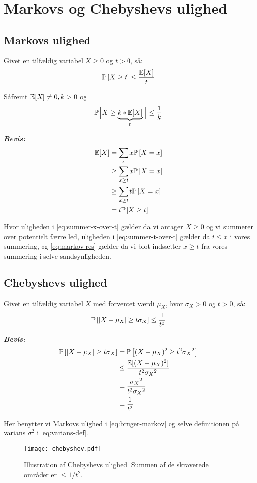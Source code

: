\section{Markovs og Chebyshevs ulighed}
\subsection{Markovs ulighed}
Givet en tilfældig variabel $X \geq 0$ og $t > 0$, så:
\begin{align}
  \P{X \geq t} \leq \frac{\E[X]}{t} \label{eq:markov}
\end{align}

Såfremt $\E[X] \neq 0, k > 0$ og
$$
\mathbb{P} \Big[X \geq \underbrace{k * \E[X]}_{t} \Big] \leq \frac{1}{k}
$$

\textit{\textbf{Bevis:}}
\begin{align}
  \E[X]
  &= \sum_x x \P{X = x} \nonumber \\
  &\geq \sum_{x \geq t} x \P{X = x} \label{eq:summer-x-over-t} \\
  &\geq \sum_{x \geq t} t \P{X = x} \label{eq:summer-t-over-t} \\
  &= t \P{X \geq t} \label{eq:markov-res}
\end{align}

Hvor uligheden i \cref{eq:summer-x-over-t} gælder da vi antager $X \geq 0$ og vi summerer over potentielt færre led, uligheden i \cref{eq:summer-t-over-t} gælder da $t \leq x$ i vores summering, og \cref{eq:markov-res} gælder da vi blot indsætter $x \geq t$ fra vores summering i selve sandsynligheden.

\subsection{Chebyshevs ulighed}
Givet en tilfældig variabel $X$ med forventet værdi $\mu_X$, hvor $\sigma_X > 0$ og $t > 0$, så:
\begin{align}
  \P{|X - \mu_X| \geq t \sigma_X} \leq \frac{1}{t^2} \label{eq:chebyshev}
\end{align}

\textit{\textbf{Bevis:}}
\begin{align}
  \P{|X - \mu_X| \geq t \sigma_X}
  &= \P{(X - \mu_X)^2 \geq t^2 {\sigma_X}^2} \nonumber \\
  &\leq \frac{\E[(X - \mu_X)^2]}{t^2 {\sigma_X}^2} \label{eq:bruger-markov} \\
  &= \frac{{\sigma_X}^2}{t^2 {\sigma_X}^2} \label{eq:varians-def} \\
  &= \frac{1}{t^2} \nonumber
\end{align}

Her benytter vi Markovs ulighed i \cref{eq:bruger-markov} og selve definitionen på varians $\sigma^2$ i \cref{eq:varians-def}.

\begin{figure}[H]
  \begin{center}
  \texttt{[image: chebyshev.pdf]}
  \end{center}
  \caption{Illustration af Chebyshevs ulighed. Summen af de skraverede områder er $\leq 1/t^2$.}
  \label{fig:chebyshev}
\end{figure}
